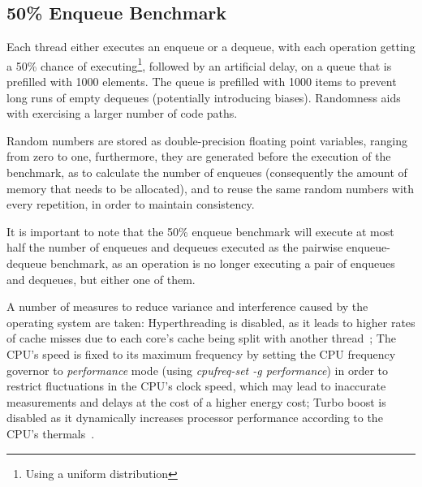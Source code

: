 \subsection{50\% Enqueue Benchmark}
Each thread either executes an enqueue or a dequeue, with each operation
getting a 50\% chance of executing\footnote{Using a uniform distribution},
followed by an artificial delay, on a queue that is prefilled with 1000
elements. The queue is prefilled with 1000 items to prevent long runs of empty
dequeues (potentially introducing biases). Randomness aids with exercising a
larger number of code paths.

Random numbers are stored as double-precision floating point variables, ranging
from zero to one, furthermore, they are generated before the execution
of the benchmark, as to calculate the number of enqueues (consequently the
amount of memory that needs to be allocated), and to reuse the same random
numbers with every repetition, in order to maintain consistency. 

It is important to note that the 50\% enqueue benchmark will execute at most
half the number of enqueues and dequeues executed as the pairwise
enqueue-dequeue benchmark, as an operation is no longer executing a pair of
enqueues and dequeues, but either one of them.

A number of measures to reduce variance and
interference caused by the operating system are taken: Hyperthreading is
disabled, as it leads to higher rates of cache misses due to each core's cache
being split with another thread~\citep{fog2020optimizing}; The CPU's speed is
fixed to its maximum frequency by setting the CPU frequency governor to
\emph{performance} mode (using \emph{cpufreq-set -g performance}) in order to
restrict fluctuations in the CPU's clock speed, which may lead to inaccurate
measurements and delays at the cost of a higher energy cost; Turbo boost is disabled as it dynamically increases
processor performance according to the CPU's thermals~\citep[Section~14.3.3]{intel2021system}.
